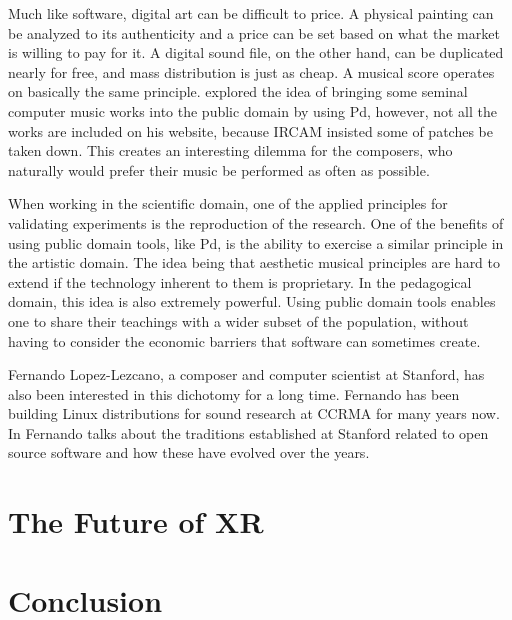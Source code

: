 Much like software, digital art can be difficult to price. A physical painting can be analyzed to its authenticity and a price can be set based on what the market is willing to pay for it. A digital sound file, on the other hand, can be duplicated nearly for free, and mass distribution is just as cheap. A musical score operates on basically the same principle. \cite{puckette2001new} explored the idea of bringing some seminal computer music works into the public domain by using Pd, however, not all the works are included on his website, because IRCAM insisted some of patches be taken down. This creates an interesting dilemma for the composers, who naturally would prefer their music be performed as often as possible. 

When working in the scientific domain, one of the applied principles for validating experiments is the reproduction of the research. One of the benefits of using public domain tools, like Pd, is the ability to exercise a similar principle in the artistic domain. The idea being that aesthetic musical principles are hard to extend if the technology inherent to them is proprietary. In the pedagogical domain, this idea is also extremely powerful. Using public domain tools enables one to share their teachings with a wider subset of the population, without having to consider the economic barriers that software can sometimes create. 

Fernando Lopez-Lezcano, a composer and computer scientist at Stanford, has also been interested in this dichotomy for a long time. Fernando has been building Linux distributions for sound research at CCRMA for many years now. In \cite{CEC-eCon28-online} Fernando talks about the traditions established at Stanford related to open source software and how these have evolved over the years. 


\section{The Future of XR}
\section{Conclusion}
